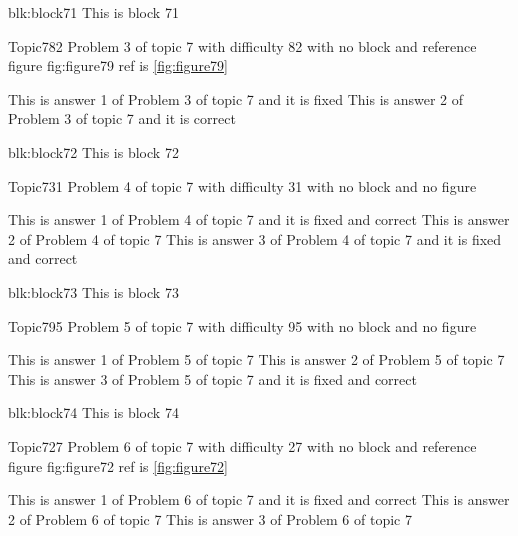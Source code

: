 \documentclass[master]{exam}
\begin{document}
\begin{block}{blk:block71}
This is block 71
\end{block}


\begin{problem}{Topic7}{82}
	Problem 3 of topic 7 with difficulty 82 with no block and reference figure fig:figure79 ref is \ref{fig:figure79}
	\begin{answers}
		\answer[fixed] This is answer 1 of Problem 3 of topic 7 and it is fixed
		\answer[correct] This is answer 2 of Problem 3 of topic 7 and it is correct
	\end{answers}
\end{problem}



\begin{block}{blk:block72}
This is block 72
\end{block}


\begin{problem}{Topic7}{31}
	Problem 4 of topic 7 with difficulty 31 with no block and no figure
	\begin{answers}
		 This is answer 1 of Problem 4 of topic 7 and it is fixed and correct
		\answer This is answer 2 of Problem 4 of topic 7 
		 This is answer 3 of Problem 4 of topic 7 and it is fixed and correct
	\end{answers}
\end{problem}



\begin{block}{blk:block73}
This is block 73
\end{block}


\begin{problem}{Topic7}{95}
	Problem 5 of topic 7 with difficulty 95 with no block and no figure
	\begin{answers}
		\answer This is answer 1 of Problem 5 of topic 7 
		\answer This is answer 2 of Problem 5 of topic 7 
		 This is answer 3 of Problem 5 of topic 7 and it is fixed and correct
	\end{answers}
\end{problem}



\begin{block}{blk:block74}
This is block 74
\end{block}


\begin{problem}{Topic7}{27}
	Problem 6 of topic 7 with difficulty 27 with no block and reference figure fig:figure72 ref is \ref{fig:figure72}
	\begin{answers}
		 This is answer 1 of Problem 6 of topic 7 and it is fixed and correct
		\answer This is answer 2 of Problem 6 of topic 7 
		\answer This is answer 3 of Problem 6 of topic 7 
	\end{answers}
\end{problem}
\end{document}
